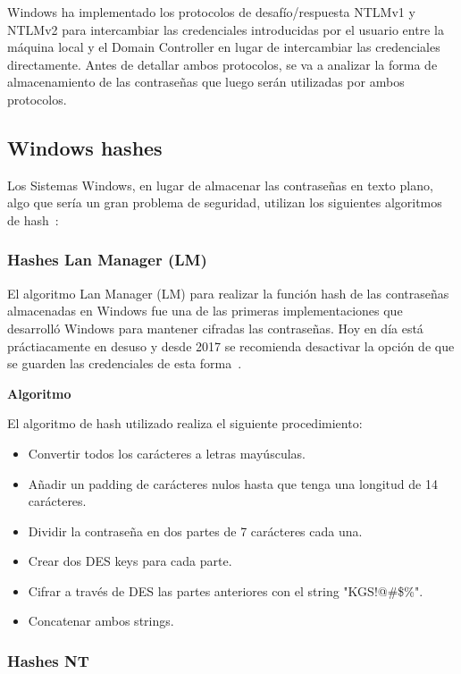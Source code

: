 Windows ha implementado los protocolos de desafío/respuesta NTLMv1 y NTLMv2 para intercambiar las credenciales introducidas por el usuario entre la máquina local y el Domain Controller en lugar de intercambiar las credenciales directamente. Antes de detallar ambos protocolos, se va a analizar la forma de almacenamiento de las contraseñas que luego serán utilizadas por ambos protocolos. 


\subsection{Windows hashes}

Los Sistemas Windows, en lugar de almacenar las contraseñas en texto plano, algo que sería un gran problema de seguridad, utilizan los siguientes algoritmos de hash~\cite{Capitulo3:Hashes}:

\subsubsection{Hashes Lan Manager (LM)}

El algoritmo Lan Manager (LM) para realizar la función hash de las contraseñas almacenadas en Windows fue una de las primeras implementaciones que desarrolló Windows para mantener cifradas las contraseñas. Hoy en día está práctiacamente en desuso y desde 2017 se recomienda desactivar la opción de que se guarden las credenciales de esta forma~\cite{Capitulo3:LMDeprecated}. 

\textbf{Algoritmo}

El algoritmo de hash utilizado realiza el siguiente procedimiento: 

\begin{itemize}
\item Convertir todos los carácteres a letras mayúsculas.
\item Añadir un padding de carácteres nulos hasta que tenga una longitud de 14 carácteres. 
\item Dividir la contraseña en dos partes de 7 carácteres cada una. 
\item Crear dos DES keys para cada parte. 
\item Cifrar a través de DES las partes anteriores con el string "KGS!@\#\$\%".
\item Concatenar ambos strings.
\end{itemize}

\subsubsection{Hashes NT}

